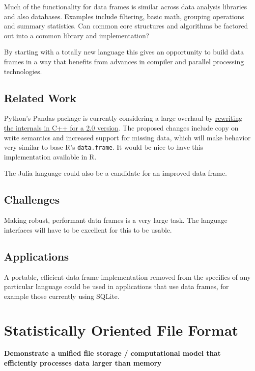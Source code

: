 \documentclass[12pt]{article}
\begin{document}
Much of the functionality for data frames is similar across data analysis
libraries and also databases. Examples include filtering, basic math,
grouping operations and summary statistics. Can common core structures
and algorithms be factored out into a common library and implementation?

By starting with a totally new language this gives an opportunity to build
data frames in a way that benefits from advances in compiler and
parallel processing technologies.

\subsection{Related Work}

Python's Pandas package is currently considering a large overhaul by
\href{https://pandas-dev.github.io/pandas2/internal-architecture.html#building-libpandas-in-c-11-14-for-lowest-level-implementation-tier}{rewriting
the internals in C++ for a 2.0 version}. The proposed changes include
copy on write semantics and increased support for missing data, which will
make behavior very similar to base R's \texttt{data.frame}.
It would be nice to have this implementation available in R.

The Julia language could also be a candidate for an improved data frame.

\subsection{Challenges}

Making robust, performant data frames is a very large task. The language
interfaces will have to be excellent for this to be usable.

\subsection{Applications}

A portable, efficient data frame implementation removed from the specifics
of any particular language could be used in applications that use
data frames, for example those currently using SQLite.

\section{Statistically Oriented File Format}

\textbf{Demonstrate a unified file storage / computational model
that efficiently processes data larger than memory}
\end{document}
